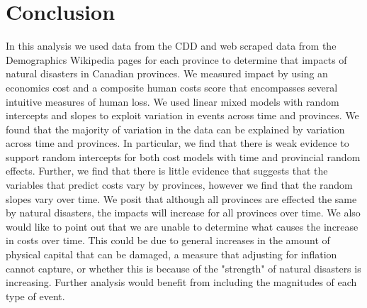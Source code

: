 \section{Conclusion}
In this analysis we used data from the CDD and web scraped data from the Demographics Wikipedia pages for each province to determine that impacts of natural disasters in Canadian provinces. We measured impact by using an economics cost and a composite human costs score that encompasses several intuitive measures of human loss.
We used linear mixed models with random intercepts and slopes to exploit variation in events across time and provinces. We found that the majority of variation in the data can be explained by variation across time and provinces. In particular, we find that there is weak evidence to support random intercepts for both cost models with time and provincial random effects. Further, we find that there is little evidence that suggests that the variables that predict costs vary by provinces, however we find that the random slopes vary over time. We posit that although all provinces are effected the same by natural disasters, the impacts will increase for all provinces over time.
We also would like to point out that we are unable to determine what causes the increase in costs over time. This could be due to general increases in the amount of physical capital that can be damaged, a measure that adjusting for inflation cannot capture, or whether this is because of the "strength" of natural disasters is increasing. Further analysis would benefit from including the magnitudes of each type of event. 